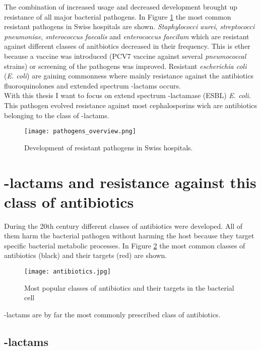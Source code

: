 The combination of increased usage and decreased development brought up resistance of all major bacterial pathogens. In Figure \ref{figure:pathogen_dvelopment} the most common resistant pathogens in Swiss hospitals are shown. \textit{Staphylococci aurei}, \textit{streptococci pneumoniae}, \textit{snterococcus faecalis} and \textit{enterococcus faecilum} which are resistant against different classes of anitbiotics decreased in their frequency. This is ether because a vaccine was introduced (PCV7 vaccine against several \textit{pneumococcal} strains) or screening of the pathogens was improved. Resistant \textit{escherichia coli} (\textit{E. coli}) are gaining commonness where mainly resistance against the antibiotics fluoroquinolones and extended spectrum \textbeta-lactams occurs. \\
With this thesis I want to focus on extend spectrum \textbeta-lactamase (ESBL) \textit{E. coli}. This pathogen evolved resistance against most cephalosporins wich are antibiotics belonging to the class of \textbeta-lactams.   

\begin{figure}
	\texttt{[image: pathogens\_overview.png]}
	\caption{Development of resistant pathogens in Swiss hospitals. \cite{swiss_hospitals_pathogens}}
	\label{figure:pathogen_dvelopment}
\end{figure}

\section{\textbeta-lactams and resistance against this class of antibiotics}
During the 20th century different classes of antibiotics were developed. All of them harm the bacterial pathogen without harming the host because they target specific bacterial metabolic processes. In Figure \ref{figure:antibiotics} the most common classes of antibiotics (black) and their targets (red) are shown.
\begin{figure}
	\texttt{[image: antibiotics.jpg]}
	\caption{Most popular classes of antibiotics and their targets in the bacterial cell \cite{wright_english:_2010}}
	\label{figure:antibiotics}
\end{figure}
\textbeta-lactams are by far the most commonly prescribed class of antibiotics.

\subsection{\textbeta-lactams}

